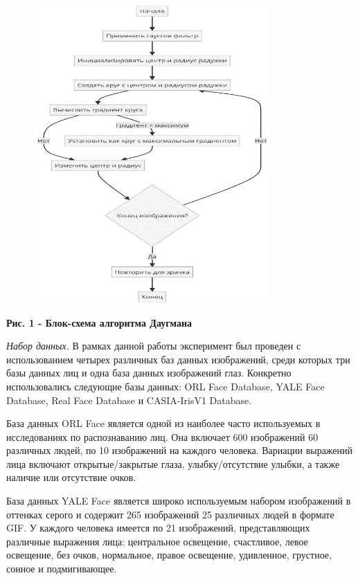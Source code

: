 \begin{figure}[H]
	\centering
	\includegraphics[width=0.8\textwidth]{assets/83}
	\caption*{}
\end{figure}

\textbf{Рис. 1 - Блок-схема алгоритма Даугмана}

\emph{Набор данных.} В рамках данной работы эксперимент был проведен с
использованием четырех различных баз данных изображений, среди которых
три базы данных лиц и одна база данных изображений глаз. Конкретно
использовались следующие базы данных: ORL Face Database, YALE Face
Database, Real Face Database и CASIA-IrisV1 Database.

База данных ORL Face является одной из наиболее часто используемых в
исследованиях по распознаванию лиц. Она включает 600 изображений 60
различных людей, по 10 изображений на каждого человека. Вариации
выражений лица включают открытые/закрытые глаза, улыбку/отсутствие
улыбки, а также наличие или отсутствие очков.

База данных YALE Face является широко используемым набором изображений в
оттенках серого и содержит 265 изображений 25 различных людей в формате
GIF. У каждого человека имеется по 21 изображений, представляющих
различные выражения лица: центральное освещение, счастливое, левое
освещение, без очков, нормальное, правое освещение, удивленное,
грустное, сонное и подмигивающее.

